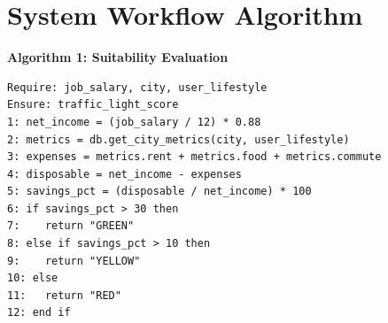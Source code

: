\section{System Workflow Algorithm}
\textbf{Algorithm 1: Suitability Evaluation}
\begin{verbatim}
Require: job_salary, city, user_lifestyle
Ensure: traffic_light_score
1: net_income = (job_salary / 12) * 0.88
2: metrics = db.get_city_metrics(city, user_lifestyle)
3: expenses = metrics.rent + metrics.food + metrics.commute
4: disposable = net_income - expenses
5: savings_pct = (disposable / net_income) * 100
6: if savings_pct > 30 then
7:    return "GREEN"
8: else if savings_pct > 10 then
9:    return "YELLOW"
10: else
11:   return "RED"
12: end if
\end{verbatim}
